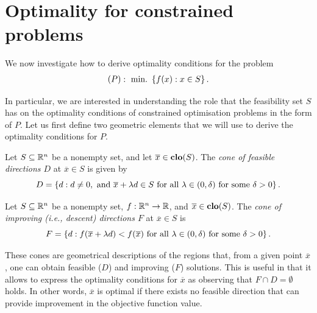 \section{Optimality for constrained problems}

We now investigate how to derive optimality conditions for the problem
\begin{align*}
	(P): ~\mathop{\text{min.~}}\left\{ f(x) : x \in S \right \}.	
\end{align*}
 
In particular, we are interested in understanding the role that the feasibility set $S$ has on the optimality conditions of constrained optimisation problems in the form of $P$. Let us first define two geometric elements that we will use to derive the optimality conditions for $P$.
%
\begin{definition}
	Let $S \subseteq \mathbb{R}^n$ be a nonempty set, and let $\overline{x} \in \mathop{\bf clo}(S)$. The \emph{cone of feasible directions $D$} at $\overline{x}\in S$ is given by
	$$ 
	D = \left\{ d : d \neq 0, \text{ and } \overline{x} + \lambda d \in S \text{ for all } \lambda \in (0,\delta) \text{ for some } \delta > 0 \right \}.
	$$
\end{definition}

\begin{definition}
Let $S \subseteq \mathbb{R}^n$ be a nonempty set, $f: \mathbb{R}^n \rightarrow \mathbb{R}$, and $\overline{x} \in \mathop{\bf clo}(S)$. The \emph{cone of improving (i.e., descent) directions $F$} at $\overline{x}\in S$ is 
$$ F = \left\{ d : f(\overline{x} + \lambda d) < f(\overline{x}) \text{ for all } \lambda \in (0,\delta) \text{ for some } \delta > 0 \right \}.
$$
\end{definition}

These cones are geometrical descriptions of the regions that, from a given point $\overline{x}$, one can obtain feasible ($D$) and improving ($F$) solutions. This is useful in that it allows to express the optimality conditions for $\overline{x}$ as  observing that $F \cap D = \emptyset$ holds. In other words, $\overline{x}$ is optimal if there exists no feasible direction that can provide improvement in the objective function value.

